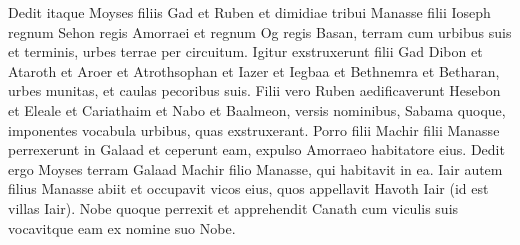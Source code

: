\begin{biblechapter}
\begin{biblechapter}
\begin{biblechapter}
\begin{biblechapter}
\begin{biblechapter}
\begin{biblechapter}
\begin{biblechapter}
\begin{biblechapter}
\begin{biblechapter}
\begin{biblechapter}
\begin{biblechapter}
\begin{biblechapter}
\begin{biblechapter}
\begin{biblechapter}
\begin{biblechapter}
\begin{biblechapter}
\begin{biblechapter}
\begin{biblechapter}
\begin{biblechapter}
\begin{biblechapter}
\begin{biblechapter}
\begin{biblechapter}
\begin{biblechapter}
\begin{biblechapter}
\begin{biblechapter}
\begin{biblechapter}
\begin{biblechapter}
\begin{biblechapter}
\begin{biblechapter}
\begin{biblechapter}
\begin{biblechapter}
\begin{biblechapter}
 \verse Dedit itaque Moyses filiis Gad et Ruben et dimidiae tribui Manasse filii Ioseph regnum Sehon regis Amorraei et regnum Og regis Basan, terram cum urbibus suis et terminis, urbes terrae per circuitum. 
\verse Igitur exstruxerunt filii Gad Dibon et Ataroth et Aroer 
\verse et Atrothsophan et Iazer et Iegbaa 
\verse et Bethnemra et Betharan, urbes munitas, et caulas pecoribus suis. 
\verse Filii vero Ruben aedificaverunt Hesebon et Eleale et Cariathaim 
\verse et Nabo et Baalmeon, versis nominibus, Sabama quoque, imponentes vocabula urbibus, quas exstruxerant. 
\verse Porro filii Machir filii Manasse perrexerunt in Galaad et ceperunt eam, expulso Amorraeo habitatore eius. 
\verse Dedit ergo Moyses terram Galaad Machir filio Manasse, qui habitavit in ea. 
\verse Iair autem filius Manasse abiit et occupavit vicos eius, quos appellavit Havoth Iair (id est villas Iair). 
\verse Nobe quoque perrexit et apprehendit Canath cum viculis suis vocavitque eam ex nomine suo Nobe.
 

\end{biblechapter}
\end{biblechapter}
\end{biblechapter}
\end{biblechapter}
\end{biblechapter}
\end{biblechapter}
\end{biblechapter}
\end{biblechapter}
\end{biblechapter}
\end{biblechapter}
\end{biblechapter}
\end{biblechapter}
\end{biblechapter}
\end{biblechapter}
\end{biblechapter}
\end{biblechapter}
\end{biblechapter}
\end{biblechapter}
\end{biblechapter}
\end{biblechapter}
\end{biblechapter}
\end{biblechapter}
\end{biblechapter}
\end{biblechapter}
\end{biblechapter}
\end{biblechapter}
\end{biblechapter}
\end{biblechapter}
\end{biblechapter}
\end{biblechapter}
\end{biblechapter}
\end{biblechapter}

